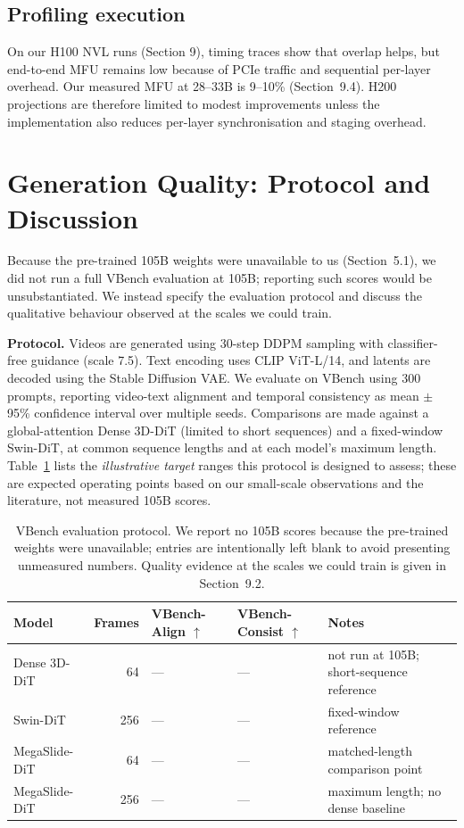 \documentclass[11pt, letterpaper]{article}
\begin{document}
\subsection{Profiling execution}
On our H100 NVL runs (Section 9), timing traces show that overlap helps, but end-to-end MFU remains low because of PCIe traffic and sequential per-layer overhead. Our measured MFU at 28--33B is 9--10\% (Section~9.4). H200 projections are therefore limited to modest improvements unless the implementation also reduces per-layer synchronisation and staging overhead.

\section{Generation Quality: Protocol and Discussion}

Because the pre-trained 105B weights were unavailable to us (Section~5.1), we did not run a full VBench evaluation at 105B; reporting such scores would be unsubstantiated. We instead specify the evaluation protocol and discuss the qualitative behaviour observed at the scales we could train.

\textbf{Protocol.} Videos are generated using 30-step DDPM sampling with classifier-free guidance (scale 7.5). Text encoding uses CLIP ViT-L/14, and latents are decoded using the Stable Diffusion VAE. We evaluate on VBench using 300 prompts, reporting video-text alignment and temporal consistency as mean $\pm$ 95\% confidence interval over multiple seeds. Comparisons are made against a global-attention Dense 3D-DiT (limited to short sequences) and a fixed-window Swin-DiT, at common sequence lengths and at each model's maximum length. Table~\ref{tab:vbench_protocol} lists the \emph{illustrative target} ranges this protocol is designed to assess; these are expected operating points based on our small-scale observations and the literature, not measured 105B scores.

\begin{table}[h]
\centering
\begin{tabular}{lrlll}
\toprule
\textbf{Model} & \textbf{Frames} & \textbf{VBench-Align $\uparrow$} & \textbf{VBench-Consist $\uparrow$} & \textbf{Notes} \\
\midrule
Dense 3D-DiT & 64 & --- & --- & not run at 105B; short-sequence reference \\
Swin-DiT & 256 & --- & --- & fixed-window reference \\
MegaSlide-DiT & 64 & --- & --- & matched-length comparison point \\
MegaSlide-DiT & 256 & --- & --- & maximum length; no dense baseline \\
\bottomrule
\end{tabular}
\caption{VBench evaluation protocol. We report no 105B scores because the pre-trained weights were unavailable; entries are intentionally left blank to avoid presenting unmeasured numbers. Quality evidence at the scales we could train is given in Section~9.2.}
\label{tab:vbench_protocol}
\end{table}
\end{document}
